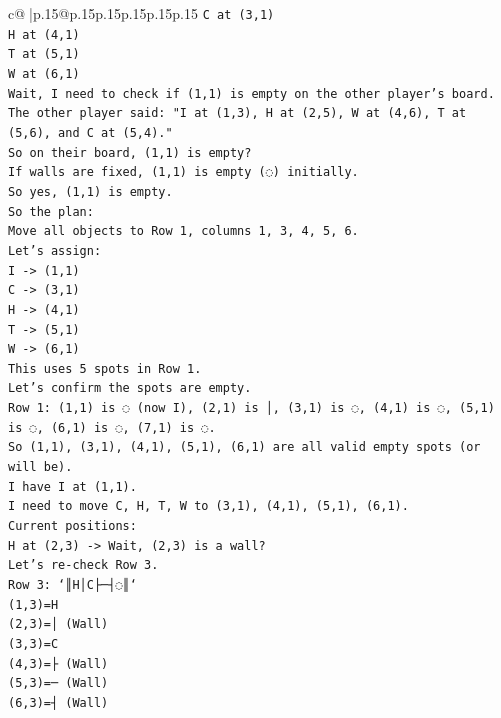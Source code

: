 \documentclass{article}
\begin{document}
{\begin{supertabular}{c@{$\;$}|p{.15\linewidth}@{}p{.15\linewidth}p{.15\linewidth}p{.15\linewidth}p{.15\linewidth}p{.15\linewidth}}
{{{\texttt{C at (3,1)} \\
\texttt{H at (4,1)} \\
\texttt{T at (5,1)} \\
\texttt{W at (6,1)} \\
\texttt{Wait, I need to check if (1,1) is empty on the other player's board.} \\
\texttt{The other player said: "I at (1,3), H at (2,5), W at (4,6), T at (5,6), and C at (5,4)."} \\
\texttt{So on their board, (1,1) is empty?} \\
\texttt{If walls are fixed, (1,1) is empty (◌) initially.} \\
\texttt{So yes, (1,1) is empty.} \\
\texttt{So the plan:} \\
\texttt{Move all objects to Row 1, columns 1, 3, 4, 5, 6.} \\
\texttt{Let's assign:} \\
\texttt{I {-}> (1,1)} \\
\texttt{C {-}> (3,1)} \\
\texttt{H {-}> (4,1)} \\
\texttt{T {-}> (5,1)} \\
\texttt{W {-}> (6,1)} \\
\texttt{This uses 5 spots in Row 1.} \\
\texttt{Let's confirm the spots are empty.} \\
\texttt{Row 1: (1,1) is ◌ (now I), (2,1) is │, (3,1) is ◌, (4,1) is ◌, (5,1) is ◌, (6,1) is ◌, (7,1) is ◌.} \\
\texttt{So (1,1), (3,1), (4,1), (5,1), (6,1) are all valid empty spots (or will be).} \\
\texttt{I have I at (1,1).} \\
\texttt{I need to move C, H, T, W to (3,1), (4,1), (5,1), (6,1).} \\
\texttt{Current positions:} \\
\texttt{H at (2,3) {-}> Wait, (2,3) is a wall?} \\
\texttt{Let's re{-}check Row 3.} \\
\texttt{Row 3: `║H│C├─┤◌║`} \\
\texttt{(1,3)=H} \\
\texttt{(2,3)=│ (Wall)} \\
\texttt{(3,3)=C} \\
\texttt{(4,3)=├ (Wall)} \\
\texttt{(5,3)=─ (Wall)} \\
\texttt{(6,3)=┤ (Wall)} \\
}}}
\end{supertabular}}
\end{document}
